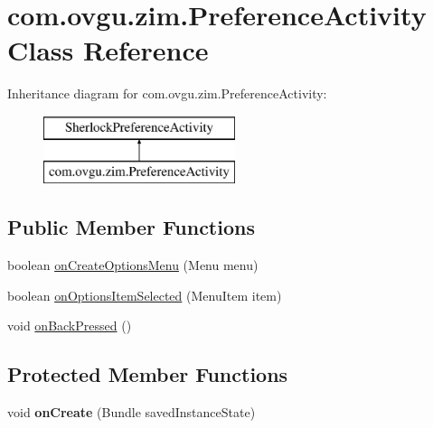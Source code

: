 \hypertarget{classcom_1_1ovgu_1_1zim_1_1_preference_activity}{\section{com.\-ovgu.\-zim.\-Preference\-Activity Class Reference}
\label{classcom_1_1ovgu_1_1zim_1_1_preference_activity}
}
Inheritance diagram for com.\-ovgu.\-zim.\-Preference\-Activity\-:\begin{figure}[H]
\begin{center}
\leavevmode
\includegraphics[height=2.000000cm]{classcom_1_1ovgu_1_1zim_1_1_preference_activity}
\end{center}
\end{figure}
\subsection*{Public Member Functions}
\begin{DoxyCompactItemize}
\item 
boolean \hyperlink{classcom_1_1ovgu_1_1zim_1_1_preference_activity_ae5d99d5ceb32fbe5e4cab59efde473df}{on\-Create\-Options\-Menu} (Menu menu)
\item 
boolean \hyperlink{classcom_1_1ovgu_1_1zim_1_1_preference_activity_a74ecec5dcb044b284cce87facb19159b}{on\-Options\-Item\-Selected} (Menu\-Item item)
\item 
void \hyperlink{classcom_1_1ovgu_1_1zim_1_1_preference_activity_a3fb88c298fd239ae6d86d0b22ee1bbc7}{on\-Back\-Pressed} ()
\end{DoxyCompactItemize}
\subsection*{Protected Member Functions}
\begin{DoxyCompactItemize}
\item 
\hypertarget{classcom_1_1ovgu_1_1zim_1_1_preference_activity_a9a9687205d6aa88d88e3f555b40d0b65}{void {\bfseries on\-Create} (Bundle saved\-Instance\-State)}\label{classcom_1_1ovgu_1_1zim_1_1_preference_activity_a9a9687205d6aa88d88e3f555b40d0b65}

\end{DoxyCompactItemize}


